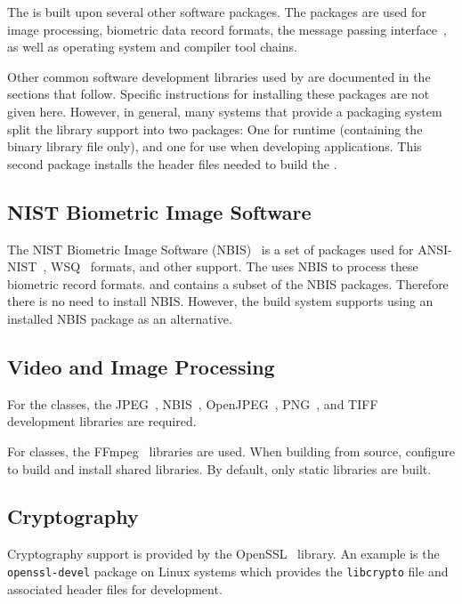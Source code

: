 The \lname is built upon several other software packages. The packages are
used for image processing, biometric data record formats, the message
passing interface~\cite{mpi}, as well as operating system and compiler
tool chains.

Other common software development libraries used by \sname are documented in
the sections that follow. Specific instructions for installing these packages
are not given here. However, in general, many systems that provide a packaging
system split the library support into two packages: One for runtime (containing
the binary library file only), and one for use when developing applications.
This second package installs the header files needed to build the \sname.

\subsection{NIST Biometric Image Software}

The NIST Biometric Image Software (NBIS)~\cite{nist:nbis} is a set of packages
used for ANSI-NIST~\cite{std:an2k}, WSQ~\cite{std:wsq} formats, and other
support.  The \sname uses NBIS to process these biometric record formats.
and contains a subset of the NBIS packages. Therefore there is no need to
install NBIS.  However, the \sname build system supports using an installed
NBIS package as an alternative.

\subsection{Video and Image Processing}

For the  classes, the JPEG~\cite{libjpeg},
NBIS~\cite{nist:nbis}, OpenJPEG~\cite{libopenjpeg}, PNG~\cite{libpng}, and
TIFF~\cite{libtiff} development libraries are required.

For  classes, the FFmpeg~\cite{libffmpeg} libraries are used.
When building from source, configure to build and
install shared libraries. By default, only static libraries are built.

\subsection{Cryptography}

Cryptography support is provided by the OpenSSL~\cite{openssl} library.
An example is the \texttt{openssl-devel} package on Linux systems which
provides the \texttt{libcrypto} file and associated header files for
development.

